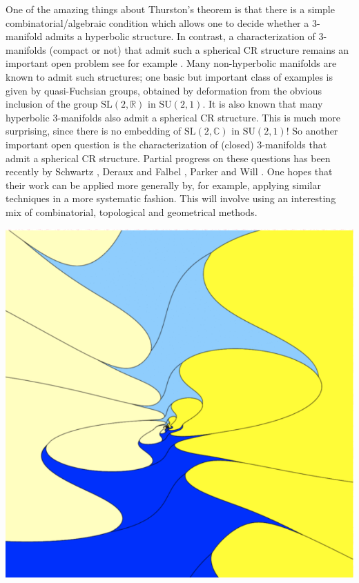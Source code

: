 \documentclass[14pt,fleqn]{article}
\begin{document}
One of the amazing things about Thurston's theorem
is that there is a simple combinatorial/algebraic
condition which allows one to decide whether 
a 3-manifold admits a hyperbolic structure.
In contrast, a characterization of
3-manifolds (compact or not) that admit such a spherical CR structure remains an important open problem see for example \cite{derauxexpmath}.
Many non-hyperbolic manifolds are known to admit such
structures; 
one basic but important class of examples is given by
quasi-Fuchsian groups, obtained by deformation from the obvious inclusion of the group
$\mathrm{SL}(2,\mathbb{R})$ in $\mathrm{SU}(2,1)$.
It is also known that many hyperbolic 3-manifolds also admit a spherical CR structure.
This is much more surprising, since there is no
embedding of $\mathrm{SL}(2,\mathbb{C})$
 in $\mathrm{SU}(2,1)$! 
So another important open question is the characterization of (closed) 3-manifolds that admit a spherical CR structure.
Partial progress on these questions
 has been recently by Schwartz \cite{schwartz}, Deraux and Falbel \cite{derauxfalbel}, Parker and  Will \cite{parkerwill}.
One hopes that their work can be applied more generally by, for example, applying similar techniques in a more systematic fashion. 
This will involve using an interesting mix of
combinatorial, topological and geometrical methods.

\begin{center}
\includegraphics[scale=.15]{cplx_hyp.png} 
\end{center}
\end{document}
